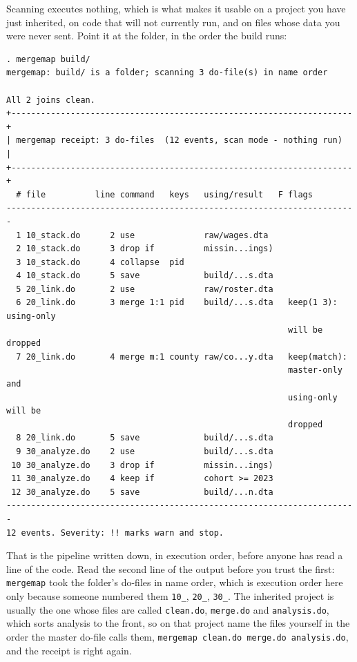 Scanning executes nothing, which is what makes it usable on a project you have just inherited, on code that will not currently run, and on files whose data you were never sent. Point it at the folder, in the order the build runs:
\par
{\footnotesize
\begin{verbatim}
. mergemap build/
mergemap: build/ is a folder; scanning 3 do-file(s) in name order

All 2 joins clean.
+---------------------------------------------------------------------+
| mergemap receipt: 3 do-files  (12 events, scan mode - nothing run)  |
+---------------------------------------------------------------------+
  # file          line command   keys   using/result   F flags
-----------------------------------------------------------------------
  1 10_stack.do      2 use              raw/wages.dta
  2 10_stack.do      3 drop if          missin...ings)
  3 10_stack.do      4 collapse  pid
  4 10_stack.do      5 save             build/...s.dta
  5 20_link.do       2 use              raw/roster.dta
  6 20_link.do       3 merge 1:1 pid    build/...s.dta   keep(1 3): using-only
                                                         will be dropped
  7 20_link.do       4 merge m:1 county raw/co...y.dta   keep(match):
                                                         master-only and
                                                         using-only will be
                                                         dropped
  8 20_link.do       5 save             build/...s.dta
  9 30_analyze.do    2 use              build/...s.dta
 10 30_analyze.do    3 drop if          missin...ings)
 11 30_analyze.do    4 keep if          cohort >= 2023
 12 30_analyze.do    5 save             build/...n.dta
-----------------------------------------------------------------------
12 events. Severity: !! marks warn and stop.
\end{verbatim}
}
That is the pipeline written down, in execution order, before anyone has read a line of the code. Read the second line of the output before you trust the first: \texttt{mergemap} took the folder's do-files in name order, which is execution order here only because someone numbered them \texttt{10\_}, \texttt{20\_}, \texttt{30\_}. The inherited project is usually the one whose files are called \texttt{clean.do}, \texttt{merge.do} and \texttt{analysis.do}, which sorts analysis to the front, so on that project name the files yourself in the order the master do-file calls them, \texttt{mergemap clean.do merge.do analysis.do}, and the receipt is right again.

